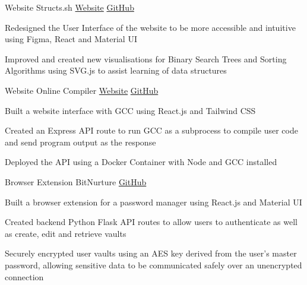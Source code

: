 

\begin{cventries}

  \cventry
    {Website} %
    {Structs.sh} %
    {\href{https://structs.sh}{\faGlobe Website}} %
    {\href{https://github.com/csesoc/structs.sh}{\faGithub GitHub}} %
    {
      \begin{cvitems} %
        \item {Redesigned the User Interface of the website to be more accessible and intuitive using Figma, React and Material UI}
        \item {Improved and created new visualisations for Binary Search Trees and Sorting Algorithms using SVG.js to assist learning of data structures}
      \end{cvitems}
    }

  \cventry
    {Website} %
    {Online Compiler} %
    {\href{https://online-debugger.onrender.com}{\faGlobe Website}} %
    {\href{https://github.com/jedwed/online-debugger}{\faGithub GitHub}} %
    {
      \begin{cvitems} %
        \item {Built a website interface with GCC using React.js and Tailwind CSS}
        \item {Created an Express API route to run GCC as a subprocess to compile user code and send program output as the response}
        \item {Deployed the API using a Docker Container with Node and GCC installed}
      \end{cvitems}
    }

    \cventry
    {Browser Extension} %
    {BitNurture} %
    {} %
    {\href{https://github.com/jedwed/bitnurture}{\faGithub GitHub}} %
    {
      \begin{cvitems} %
        \item {Built a browser extension for a password manager using React.js and Material UI}
        \item {Created backend Python Flask API routes to allow users to authenticate as well as create, edit and retrieve vaults}
        \item {Securely encrypted user vaults using an AES key derived from the user's master password, allowing sensitive data to be communicated safely over an unencrypted connection}
      \end{cvitems}
    }

\end{cventries}
